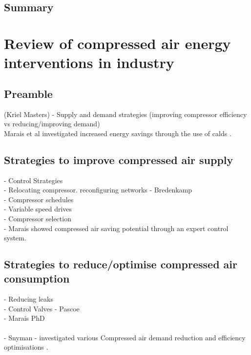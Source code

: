 	\subsection{Summary}
\section{Review of compressed air energy interventions in industry}
	\subsection{Preamble}
	(Kriel Masters)
	- Supply and demand strategies (improving compressor efficiency vs reducing/improving demand)\\
	Marais et al investigated increased energy savings through the use of \gls{calds} \cite{marais2009increased}.
	\subsection{Strategies to improve compressed air supply}
		- Control Strategies\\
		- Relocating compressor. reconfiguring networks - Bredenkamp\\
		- Compressor schedules\\
		- Variable speed drives\\
		- Compressor selection\\
		- Marais showed compressed air saving potential through an expert control 	system.\cite{marais2010expert}\\
	\subsection{Strategies to reduce/optimise compressed air consumption}
		- Reducing leaks\\
		- Control Valves - Pascoe\\
		- Marais PhD\\
\\
		- Snyman - investigated various Compressed air demand reduction and efficiency optimisations \cite{Snyman2011Masters}.

